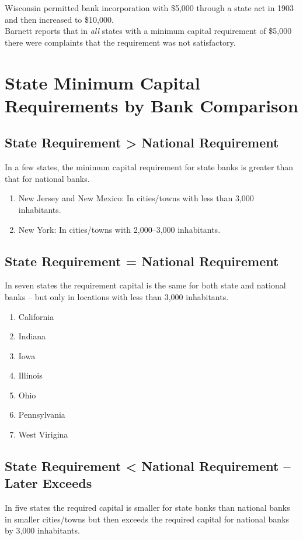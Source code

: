 ﻿\documentclass[12pt]{report}
\begin{document}
Wisconsin permitted bank incorporation with \$5,000 through a state act in 1903 and then increased to \$10,000.\\

Barnett reports that in \emph{all} states with a minimum capital requirement of \$5,000 there were complaints that the requirement was not satisfactory.



\chapter{State Minimum Capital Requirements by Bank Comparison}

\section{State Requirement > National Requirement}
In a few states, the minimum capital requirement for state banks is greater than that for national banks.

\begin{enumerate}
\item New Jersey and New Mexico: In cities/towns with less than 3,000 inhabitants.
\item New York: In cities/towns with 2,000--3,000 inhabitants.
\end{enumerate}

\section{State Requirement = National Requirement}
In seven states the requirement capital is the same for both state and national banks -- but only in locations with less than 3,000 inhabitants.

\begin{enumerate}
\item California
\item Indiana
\item Iowa
\item Illinois
\item Ohio
\item Pennsylvania
\item West Virigina
\end{enumerate}

\section{State Requirement < National Requirement -- Later Exceeds}
In five states the required capital is smaller for state banks than national banks in smaller cities/towns but then exceeds the required capital for national banks by 3,000 inhabitants.
\end{document}
